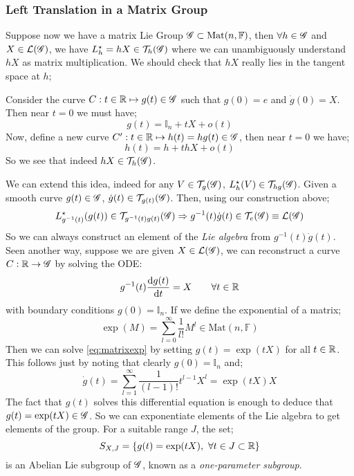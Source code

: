 \subsubsection*{Left Translation in a Matrix Group}
Suppose now we have a matrix Lie Group $\mathscr{G} \subset \text{Mat}(n, \mathbb{F})$, then $\forall h \in \mathscr{G}$ and $X \in \mathcal{L}(\mathscr{G})$, we have $L_h^{\star} = hX \in \mathcal{T}_h(\mathscr{G})$ where we can unambiguously understand $hX$ as matrix multiplication. We should check that $hX$ really lies in the tangent space at $h$;
\begin{examplebox}
Consider the curve $C : t \in \mathbb{R} \mapsto g(t) \in \mathscr{G}$ such that $g(0) = e$ and $\dot{g}(0) = X$. Then near $t = 0$ we must have;
\begin{equation*}
g(t) = \mathbb{I}_n + tX + o(t)
\end{equation*}
Now, define a new curve $C^{\prime} : t\in \mathbb{R} \mapsto h(t) = hg(t) \in \mathscr{G}$, then near $t = 0$ we have;
\begin{equation*}
h(t) = h + t hX + o(t)
\end{equation*}
So we see that indeed $hX \in \mathcal{T}_h(\mathscr{G})$. 
\end{examplebox}
We can extend this idea, indeed for any $V \in \mathcal{T}_g(\mathscr{G})$, $L_h^\star(V) \in \mathcal{T}_{hg}(\mathscr{G})$. Given a smooth curve $g(t) \in \mathscr{G}$, $\dot{g}(t) \in \mathcal{T}_{g(t)}(\mathscr{G})$. Then, using our construction above;
\begin{equation}
L_{g^{-1}(t)}^{\star}\left(g(t)\right) \in \mathcal{T}_{g^{-1}(t)g(t)}(\group) \Rightarrow g^{-1}(t)\dot{g}(t) \in \mathcal{T}_e(\group) \equiv \mL(\group)
\end{equation}
So we can always construct an element of the \emph{Lie algebra} from $g^{-1}(t)\dot{g}(t)$. Seen another way, suppose we are given $X \in \mathcal{L}(\mathscr{G})$, we can reconstruct a curve $C : \mathbb{R} \rightarrow \mathscr{G}$ by solving the ODE:
\begin{equation}
\label{eq:matrixexp}
g^{-1}(t)\frac{\text{d} g(t)}{\text{d} t} = X \qquad \forall t \in \mathbb{R}
\end{equation}
with boundary conditions $g(0) = \mathbb{I}_n$. If we define the exponential of a matrix;
\begin{equation*}
\exp(M) = \sum_{l = 0}^{\infty}{\frac{1}{l!}M^l} \in \text{Mat}(n, \mathbb{F})
\end{equation*}
Then we can solve \eqref{eq:matrixexp} by setting $g(t) = \exp(t X)$ for all $t \in \mathbb{R}$. This follows just by noting that clearly $g(0) = \mathbb{I}_n$ and;
\begin{equation*}
\dot{g}(t) = \sum_{l = 1}^{\infty}{\frac{1}{(l - 1)!}t^{l - 1}X^l} = \exp(tX)X
\end{equation*}
The fact that $g(t)$ solves this differential equation is enough to deduce that $g(t) = \exp(tX) \in \mathscr{G}$. So we can exponentiate elements of the Lie algebra to get elements of the group. For a suitable range $J$, the set;
\begin{equation*}
S_{X, J} = \set{g(t) = \exp(t X), \,\, \forall t \in J \subset \RR}
\end{equation*}
is an Abelian Lie subgroup of $\mathscr{G}$, known as a \emph{one-parameter subgroup}.
